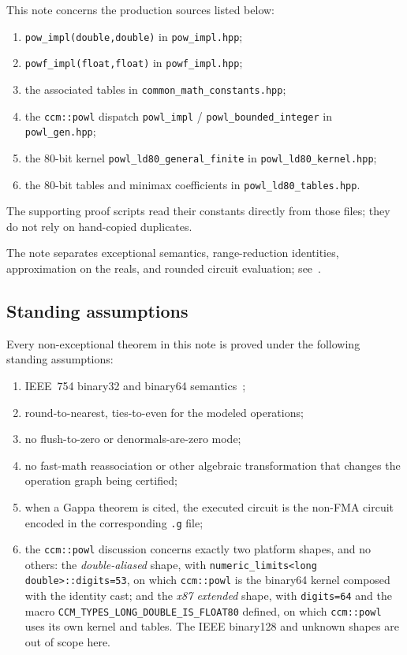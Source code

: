 \documentclass[11pt]{article}
\theoremstyle{plain}
\theoremstyle{remark}
\newcommand{\Powl}{\texttt{ccm::powl}}
\begin{document}
This note concerns the production sources listed below:
\begin{enumerate}[label=(O\arabic*)]
  \item \texttt{pow\_impl(double,double)} in \texttt{pow\_impl.hpp};
  \item \texttt{powf\_impl(float,float)} in \texttt{powf\_impl.hpp};
  \item the associated tables in \texttt{common\_math\_constants.hpp};
  \item the \Powl{} dispatch \texttt{powl\_impl} / \texttt{powl\_bounded\_integer}
    in \texttt{powl\_gen.hpp};
  \item the 80-bit kernel \texttt{powl\_ld80\_general\_finite} in
    \texttt{powl\_ld80\_kernel.hpp};
  \item the 80-bit tables and minimax coefficients in
    \texttt{powl\_ld80\_tables.hpp}.
\end{enumerate}
The supporting proof scripts read their constants directly from those files;
they do not rely on hand-copied duplicates.

The note separates exceptional semantics, range-reduction identities,
approximation on the reals, and rounded circuit evaluation; see~\cite{powr,coremath}.

\subsection{Standing assumptions}

Every non-exceptional theorem in this note is proved under the following
standing assumptions:
\begin{enumerate}[label=(A\arabic*)]
  \item IEEE~754 binary32 and binary64 semantics~\cite{ieee754};
  \item round-to-nearest, ties-to-even for the modeled operations;
  \item no flush-to-zero or denormals-are-zero mode;
  \item no fast-math reassociation or other algebraic transformation that
    changes the operation graph being certified;
  \item when a Gappa theorem is cited, the executed circuit is the non-FMA
    circuit encoded in the corresponding \texttt{.g} file;
  \item the \Powl{} discussion concerns exactly two platform shapes, and no
    others: the \emph{double-aliased} shape, with
    \texttt{numeric\_limits<long double>::digits=53}, on which \Powl{} is the
    binary64 kernel composed with the identity cast; and the
    \emph{x87 extended} shape, with \texttt{digits=64} and the macro
    \texttt{CCM\_TYPES\_LONG\_DOUBLE\_IS\_FLOAT80} defined, on which \Powl{} uses
    its own kernel and tables.  The IEEE binary128 and unknown shapes are out of
    scope here.
\end{enumerate}
\end{document}
